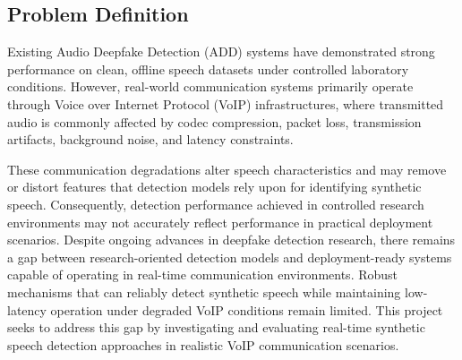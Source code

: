 \subsection{Problem Definition}

Existing Audio Deepfake Detection (ADD) systems have demonstrated strong performance on clean, offline speech datasets under controlled laboratory conditions. However, real-world communication systems primarily operate through Voice over Internet Protocol (VoIP) infrastructures, where transmitted audio is commonly affected by codec compression, packet loss, transmission artifacts, background noise, and latency constraints.

These communication degradations alter speech characteristics and may remove or distort features that detection models rely upon for identifying synthetic speech. Consequently, detection performance achieved in controlled research environments may not accurately reflect performance in practical deployment scenarios. Despite ongoing advances in deepfake detection research, there remains a gap between research-oriented detection models and deployment-ready systems capable of operating in real-time communication environments. Robust mechanisms that can reliably detect synthetic speech while maintaining low-latency operation under degraded VoIP conditions remain limited. This project seeks to address this gap by investigating and evaluating real-time synthetic speech detection approaches in realistic VoIP communication scenarios.
